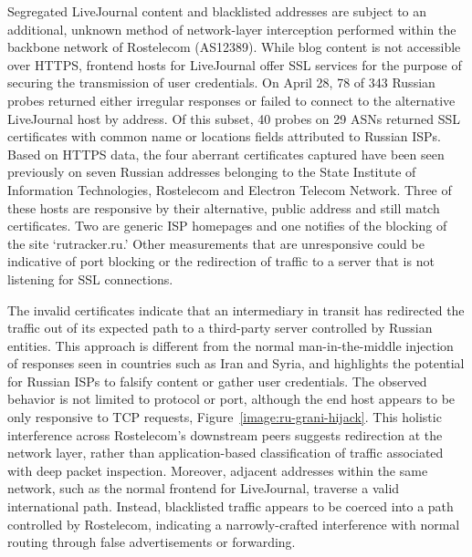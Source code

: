 Segregated LiveJournal content and blacklisted addresses are subject to
an additional, unknown method of network-layer interception performed
within the backbone network of Rostelecom (AS12389). While blog content
is not accessible over HTTPS, frontend hosts for LiveJournal offer SSL
services for the purpose of securing the transmission of user
credentials. On April 28, 78 of 343 Russian probes returned either
irregular responses or failed to connect to the alternative LiveJournal
host by address. Of this subset, 40 probes on 29 ASNs returned SSL
certificates with common name or locations fields attributed to Russian
ISPs. Based on HTTPS data, the four aberrant certificates captured have
been seen previously on seven Russian addresses belonging to the State
Institute of Information Technologies, Rostelecom and Electron Telecom
Network. Three of these hosts are responsive by their alternative,
public address and still match certificates. Two are generic ISP
homepages and one notifies of the blocking of the site `rutracker.ru.'
Other measurements that are unresponsive could be indicative of port
blocking or the redirection of traffic to a server that is not listening
for SSL connections.

The invalid certificates indicate that an intermediary in transit has
redirected the traffic out of its expected path to a third-party server
controlled by Russian entities. This approach is different from the
normal man-in-the-middle injection of responses seen in countries such
as Iran and Syria, and highlights the potential for Russian ISPs to
falsify content or gather user credentials. The observed behavior is not
limited to protocol or port, although the end host appears to be only
responsive to TCP requests, Figure~\ref{image:ru-grani-hijack}. This
holistic interference across Rostelecom's downstream peers suggests
redirection at the network layer, rather than application-based
classification of traffic associated with deep packet inspection.
Moreover, adjacent addresses within the same network, such as the normal
frontend for LiveJournal, traverse a valid international path. Instead,
blacklisted traffic appears to be coerced into a path controlled by
Rostelecom, indicating a narrowly-crafted interference with normal
routing through false advertisements or forwarding.
